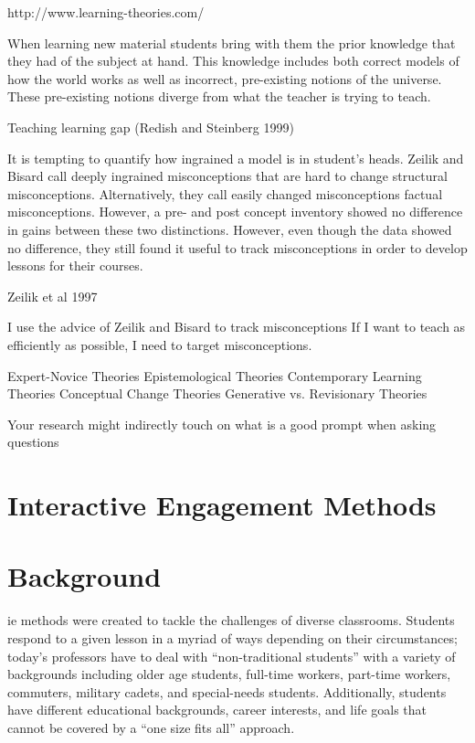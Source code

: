 http://www.learning-theories.com/

When learning new material students bring with them the prior knowledge that they had of the subject at hand. This knowledge includes both correct models of how the world works as well as incorrect, pre-existing notions of the universe. These pre-existing notions diverge from what the teacher is trying to teach.

Teaching learning gap (Redish and Steinberg 1999)

It is tempting to quantify how ingrained a model is in student's heads. Zeilik and Bisard call deeply ingrained misconceptions that are hard to change structural misconceptions. Alternatively, they call easily changed misconceptions factual misconceptions\cite{zeilik2000}. However, a pre- and post concept inventory showed no difference in gains between these two distinctions. However, even though the data showed no difference, they still found it useful to track misconceptions in order to develop lessons for their courses.

Zeilik et al 1997

I use the advice of Zeilik and  Bisard to track misconceptions\cite{zeilik2000}
If I want to teach as efficiently as possible, I need to target misconceptions.

Expert-Novice Theories
Epistemological Theories
Contemporary Learning Theories
Conceptual Change Theories
Generative vs. Revisionary Theories

Your research might indirectly touch on what is a good prompt when asking questions

\section{Interactive Engagement Methods}

\section{Background}

\gls{ie} methods were created to tackle the challenges of diverse classrooms. Students respond to a given lesson in a myriad of ways depending on their circumstances; today's professors have to deal with ``non-traditional students'' with a variety of backgrounds including older age students, full-time workers, part-time workers, commuters, military cadets, and special-needs students. Additionally, students have different educational backgrounds, career interests, and life goals that cannot be covered by a ``one size fits all'' approach\cite{novak1999}.

